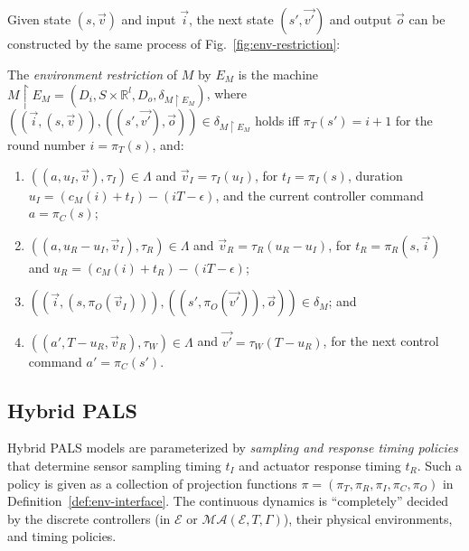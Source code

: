 Given state $(s, \vec{v})$ and input $\vec{i}$,
the next state $(s', \vec{v'})$ and output $\vec{o}$ can be constructed %
by the same process of Fig.~\ref{fig:env-restriction}:

\begin{definition}
\label{def:env-res}
The \emph{environment restriction} of $M$ by $E_M$ 
is the machine
$M \restriction E_M = (D_i, S \times \mathbb{R}^l, D_o, \delta_{M \restriction E_M})$,
where
$( (\vec{i}, (s,\vec{v})), ((s',\vec{v'}), \vec{o}) ) \in \delta_{M \restriction E_M}$ holds iff
 $\pi_T(s') = i + 1$ for the round number $i = \pi_T(s)$, and:
\begin{enumerate}
    \item %
    $((a,u_I,\vec{v}),\tau_I) \in \Lambda$ and $\vec{v}_I = \tau_I(u_I)$,
    for  $t_I = \pi_I(s)$, duration $u_I = (c_M(i)+t_I)-(iT-\epsilon)$, and
    the current controller command $a = \pi_C(s)$;

    \item %
    $((a,u_R-u_I,\vec{v}_I),\tau_R) \in \Lambda$ and $\vec{v}_R = \tau_R(u_R-u_I)$,
    for $t_R = \pi_R(s,\vec{i})$ and $u_R = (c_M(i)+t_R) - (iT-\epsilon)$;

    \item %
    $( (\vec{i}, (s,\pi_O(\vec{v}_I))), ((s',\pi_O(\vec{v'})), \vec{o}) ) \in \delta_{M}$; and
    
    \item %
    $((a',T - u_R,\vec{v}_R),\tau_W) \in \Lambda$ and  $\vec{v'} = \tau_W(T - u_R)$,
    for the next control command $a' = \pi_C(s')$.
\end{enumerate}
\end{definition}



\subsection{Hybrid PALS}

Hybrid PALS models are parameterized by \emph{sampling and response timing policies}
that 
determine sensor sampling timing $t_I$ and actuator response timing $t_R$.
Such a policy 
is given as a collection of 
projection functions $\pi=(\pi_T, \pi_R, \pi_I, \pi_C, \pi_O)$ 
in Definition~\ref{def:env-interface}.
The continuous dynamics %
is ``completely'' decided  
by the discrete controllers (in $\mathcal{E}$ or $\mathcal{MA}(\mathcal{E},T,\Gamma)$),
their physical environments, and timing policies.


